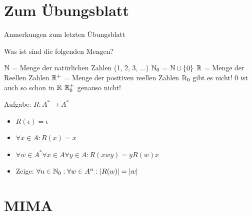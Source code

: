 \def\tutdate{1.12.2016}






\section{Zum Übungsblatt}

\begin{frame}{Anmerkungen zum letzten Übungsblatt}
	\begin{itemize}
		\pitem Was ist sind die folgenden Mengen?
		\begin{itemize}
			\pitem $\mathbb{N}$ \pause = Menge der natürlichen Zahlen (1, 2, 3, ...)
			\pitem $\mathbb{N}_0$ \pause = $\mathbb{N} \cup \{0\}$
			\pitem $\mathbb{R}$ \pause = Menge der Reellen Zahlen
			\pitem $\mathbb{R}^+$ \pause = Menge der positiven reellen Zahlen
			\pitem $\mathbb{R}_0$ \pause gibt es nicht! $0$ ist auch so schon in $\mathbb{R}$
			\pitem $\mathbb{R}_0^+$ genauso nicht!
		\end{itemize}
		\pitem Aufgabe: $R: A^* \rightarrow A^*$
		\begin{itemize}
			\item $R(\epsilon) = \epsilon$
			\item $\forall x \in A: R(x) = x$
			\item $\forall w \in A^* \forall x \in A \forall y \in A: R(xwy) = yR(w)x$
			\item Zeige: $\forall n \in \mathbb{N}_0 : \forall w \in A^n: |R(w)| = |w|$
		\end{itemize}
	\end{itemize}
\end{frame}

\section{MIMA}

